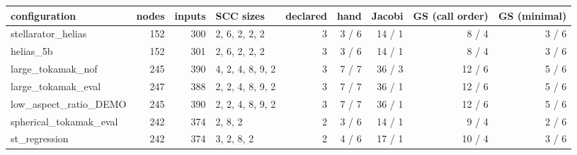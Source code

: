 \begin{tabular}{lrrlrrrrr}
\toprule
configuration & nodes & inputs & SCC sizes & declared & hand & Jacobi & GS (call order) & GS (minimal) \\
\midrule
stellarator\_helias & 152 & 300 & 2, 6, 2, 2, 2 & 3 & 3 / 6 & 14 / 1 & 8 / 4 & 3 / 6 \\
helias\_5b & 152 & 301 & 2, 6, 2, 2, 2 & 3 & 3 / 6 & 14 / 1 & 8 / 4 & 3 / 6 \\
large\_tokamak\_nof & 245 & 390 & 4, 2, 4, 8, 9, 2 & 3 & 7 / 7 & 36 / 3 & 12 / 6 & 5 / 6 \\
large\_tokamak\_eval & 247 & 388 & 2, 2, 4, 8, 9, 2 & 3 & 7 / 7 & 36 / 1 & 12 / 6 & 5 / 6 \\
low\_aspect\_ratio\_DEMO & 245 & 390 & 2, 2, 4, 8, 9, 2 & 3 & 7 / 7 & 36 / 1 & 12 / 6 & 5 / 6 \\
spherical\_tokamak\_eval & 242 & 374 & 2, 8, 2 & 2 & 3 / 6 & 14 / 1 & 9 / 4 & 2 / 6 \\
st\_regression & 242 & 374 & 3, 2, 8, 2 & 2 & 4 / 6 & 17 / 1 & 10 / 4 & 3 / 6 \\
\bottomrule
\end{tabular}
